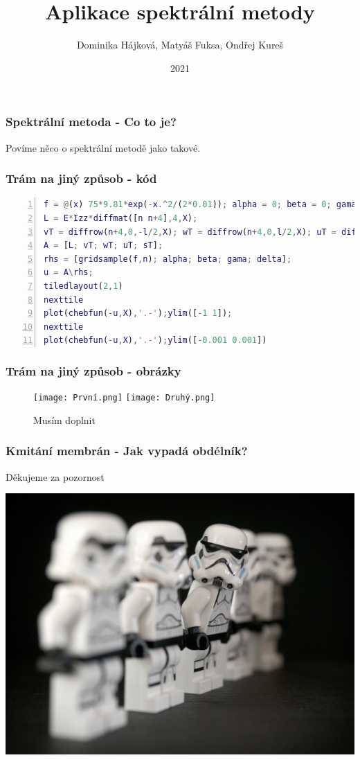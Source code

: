 \documentclass{beamer}
\title{Aplikace spektrální metody}
\author{Dominika Hájková, Matyáš Fuksa, Ondřej Kureš}
\institute{Stormtrooperz}
\date{2021}
\begin{document}
\frame{\titlepage}
\begin{frame}
\frametitle{Spektrální metoda - Co to je?}
Povíme něco o spektrální metodě jako takové.
\end{frame}

\begin{frame}[fragile]
\frametitle{Trám na jiný způsob - kód}
\begin{lstlisting}[language=Matlab, basicstyle=\small, numbers=left,breaklines=true]
f = @(x) 75*9.81*exp(-x.^2/(2*0.01)); alpha = 0; beta = 0; gama = 0 ;delta = 0; n = 18; E = 9.4*10^6; Izz = 3;l = 10;X = [-l/2,l/2];
L = E*Izz*diffmat([n n+4],4,X);
vT = diffrow(n+4,0,-l/2,X); wT = diffrow(n+4,0,l/2,X); uT = diffrow(n+4,1,-l/2,X); sT = diffrow(n+4,1,l/2,X);
A = [L; vT; wT; uT; sT];
rhs = [gridsample(f,n); alpha; beta; gama; delta];
u = A\rhs;
tiledlayout(2,1)
nexttile
plot(chebfun(-u,X),'.-');ylim([-1 1]);
nexttile
plot(chebfun(-u,X),'.-');ylim([-0.001 0.001])
\end{lstlisting}
\end{frame}

\begin{frame}
\frametitle{Trám na jiný způsob - obrázky}
\centering
\begin{figure}
\texttt{[image: První.png]}
\texttt{[image: Druhý.png]}
\caption{Musím doplnit}
\end{figure}
\end{frame}

\begin{frame}
\frametitle{Kmitání membrán - Jak vypadá obdélník?}
\end{frame}


\begin{frame}
\begin{center}
\begin{huge}
Děkujeme za pozornost
\end{huge}
  \centering
  \includegraphics[width=.8\linewidth]{stormtroop.jpg}
\end{center}

\end{frame}
\end{document}
